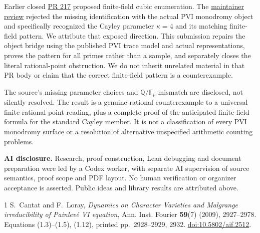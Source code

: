 \documentclass[10pt]{article}
\begin{document}
Earlier closed \href{https://github.com/The-Last-Math-Competition/The-Last-Math-Competition/pull/217}{PR 217} proposed finite-field cubic enumeration. The \href{https://github.com/The-Last-Math-Competition/The-Last-Math-Competition/pull/217#issuecomment-5965634432}{maintainer review} rejected the missing identification with the actual PVI monodromy object and specifically recognized the Cayley parameter $\kappa=4$ and its matching finite-field pattern. We attribute that exposed direction. This submission repairs the object bridge using the published PVI trace model and actual representations, proves the pattern for all primes rather than a sample, and separately closes the literal rational-point obstruction. We do not inherit unrelated material in that PR body or claim that the correct finite-field pattern is a counterexample.

The source's missing parameter choices and $\mathbb Q/\mathbb F_p$ mismatch are disclosed, not silently resolved. The result is a genuine rational counterexample to a universal finite rational-point reading, plus a complete proof of the anticipated finite-field formula for the standard Cayley member. It is not a classification of every PVI monodromy surface or a resolution of alternative unspecified arithmetic counting problems.

\textbf{AI disclosure.} Research, proof construction, Lean debugging and document preparation were led by a Codex worker, with separate AI supervision of source semantics, proof scope and PDF layout. No human verification or organizer acceptance is asserted. Public ideas and library results are attributed above.

\begin{thebibliography}{1}
 S.~Cantat and F.~Loray, \emph{Dynamics on Character Varieties and Malgrange irreducibility of Painlev\'e VI equation}, Ann. Inst. Fourier \textbf{59}(7) (2009), 2927--2978. Equations (1.3)--(1.5), (1.12), printed pp.~2928--2929, 2932. \href{https://doi.org/10.5802/aif.2512}{doi:10.5802/aif.2512}.
\end{thebibliography}
\end{document}
